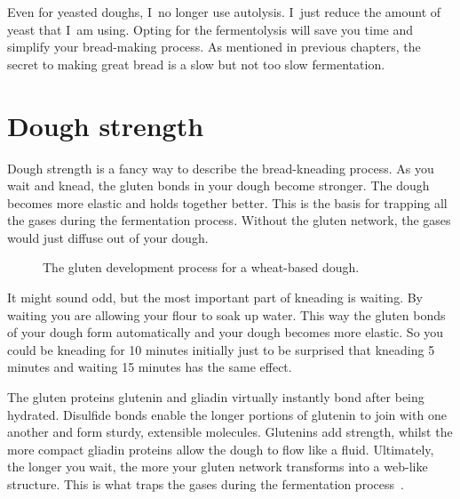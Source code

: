Even for yeasted doughs, I~no longer use autolysis. I~just reduce the amount
of yeast that I~am using. Opting for the fermentolysis will
save you time and simplify your bread-making process. As mentioned in previous chapters,
the secret to making great bread is a slow but not too slow fermentation.

\section{Dough strength}

Dough strength is a fancy way to describe the bread-kneading process. As you wait and
knead, the gluten bonds in your dough become stronger. The dough
becomes more elastic and holds together better. This is the basis for trapping
all the gases during the fermentation process. Without the gluten network,
the gases would just diffuse out of your dough.

\begin{figure}[!htb]
\begin{center}
  
  \caption{The gluten development process for a wheat-based dough.}%
  \label{fig:wheat-sourdough-kneading-process}
\end{center}
\end{figure}

It might sound odd, but the most important part of kneading is waiting. By
waiting you are allowing your flour to soak up water. This way the gluten
bonds of your dough form automatically and your dough becomes more elastic.
So you could be kneading for 10 minutes initially just to be surprised
that kneading 5 minutes and waiting 15 minutes has the same effect.

The gluten proteins glutenin and gliadin virtually instantly bond after being
hydrated. Disulfide bonds enable the longer portions of
glutenin to join with one another and form sturdy, extensible molecules.
Glutenins add strength, whilst the more compact gliadin proteins allow
the dough to flow like a fluid. Ultimately, the longer you wait, the more
your gluten network transforms into a web-like structure. This is what
traps the gases during the fermentation process~\cite{how+does+gluten+work}.

